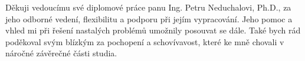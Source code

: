 
\begin{acknowledgements}
\vspace{1cm}
Děkuji vedoucímu své diplomové práce panu Ing. Petru Neduchalovi, Ph.D., za jeho odborné vedení, flexibilitu a podporu při jejím vypracování. Jeho pomoc a vhled mi při řešení nastalých problémů umožnily posouvat se dále. Také bych rád poděkoval svým blízkým za pochopení a schovívavost, které ke mně chovali v náročné závěrečné části studia.

\end{acknowledgements}